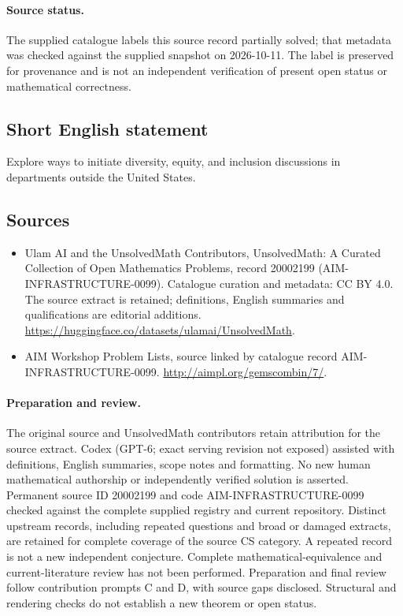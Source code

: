 \documentclass[11pt]{article}
\begin{document}
\paragraph{Source status.}
The supplied catalogue labels this source record partially solved; that metadata was checked against the supplied snapshot on 2026-10-11. The label is preserved for provenance and is not an independent verification of present open status or mathematical correctness.
\subsection{Short English statement}
Explore ways to initiate diversity, equity, and inclusion discussions in departments outside the United States.
\subsection{Sources}
\begin{itemize}
\item[\hypertarget{source:20002199:1}{S1}] Ulam AI and the UnsolvedMath Contributors, UnsolvedMath: A Curated Collection of Open Mathematics Problems, record 20002199 (AIM-INFRASTRUCTURE-0099). Catalogue curation and metadata: CC BY 4.0. The source extract is retained; definitions, English summaries and qualifications are editorial additions.
\url{https://huggingface.co/datasets/ulamai/UnsolvedMath}.
\item[\hypertarget{source:20002199:2}{S2}] AIM Workshop Problem Lists, source linked by catalogue record AIM-INFRASTRUCTURE-0099.
\url{http://aimpl.org/gemscombin/7/}.
\end{itemize}
\paragraph{Preparation and review.}
The original source and UnsolvedMath contributors retain attribution for the source extract. Codex (GPT-6; exact serving revision not exposed) assisted with definitions, English summaries, scope notes and formatting. No new human mathematical authorship or independently verified solution is asserted. Permanent source ID 20002199 and code AIM-INFRASTRUCTURE-0099 checked against the complete supplied registry and current repository. Distinct upstream records, including repeated questions and broad or damaged extracts, are retained for complete coverage of the source CS category. A repeated record is not a new independent conjecture. Complete mathematical-equivalence and current-literature review has not been performed. Preparation and final review follow contribution prompts C and D, with source gaps disclosed. Structural and rendering checks do not establish a new theorem or open status.
\label{end:20002199}
\end{document}
